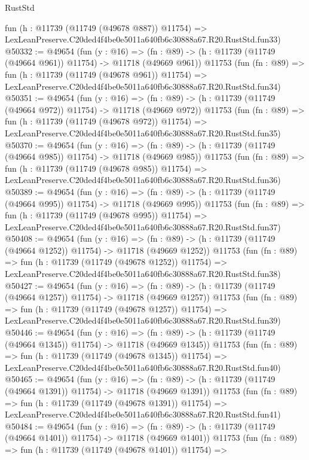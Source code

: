 \begin{lexlean}{RustStd}
\begin{coremodule}
    fun (h : @11739 (@11749 (@49678 @887)) @11754) =>
    LexLeanPreserve.C20ded4f4be0e5011a640fb6c30888a67.R20.RustStd.fun33)
@50332 := @49654
    (fun (y : @16) =>
    (fn : @89) -> (h : @11739 (@11749 (@49664 @961)) @11754) -> @11718 (@49669 @961))
    @11753
    (fun (fn : @89) =>
    fun (h : @11739 (@11749 (@49678 @961)) @11754) =>
    LexLeanPreserve.C20ded4f4be0e5011a640fb6c30888a67.R20.RustStd.fun34)
@50351 := @49654
    (fun (y : @16) =>
    (fn : @89) -> (h : @11739 (@11749 (@49664 @972)) @11754) -> @11718 (@49669 @972))
    @11753
    (fun (fn : @89) =>
    fun (h : @11739 (@11749 (@49678 @972)) @11754) =>
    LexLeanPreserve.C20ded4f4be0e5011a640fb6c30888a67.R20.RustStd.fun35)
@50370 := @49654
    (fun (y : @16) =>
    (fn : @89) -> (h : @11739 (@11749 (@49664 @985)) @11754) -> @11718 (@49669 @985))
    @11753
    (fun (fn : @89) =>
    fun (h : @11739 (@11749 (@49678 @985)) @11754) =>
    LexLeanPreserve.C20ded4f4be0e5011a640fb6c30888a67.R20.RustStd.fun36)
@50389 := @49654
    (fun (y : @16) =>
    (fn : @89) -> (h : @11739 (@11749 (@49664 @995)) @11754) -> @11718 (@49669 @995))
    @11753
    (fun (fn : @89) =>
    fun (h : @11739 (@11749 (@49678 @995)) @11754) =>
    LexLeanPreserve.C20ded4f4be0e5011a640fb6c30888a67.R20.RustStd.fun37)
@50408 := @49654
    (fun (y : @16) =>
    (fn : @89) -> (h : @11739 (@11749 (@49664 @1252)) @11754) -> @11718 (@49669 @1252))
    @11753
    (fun (fn : @89) =>
    fun (h : @11739 (@11749 (@49678 @1252)) @11754) =>
    LexLeanPreserve.C20ded4f4be0e5011a640fb6c30888a67.R20.RustStd.fun38)
@50427 := @49654
    (fun (y : @16) =>
    (fn : @89) -> (h : @11739 (@11749 (@49664 @1257)) @11754) -> @11718 (@49669 @1257))
    @11753
    (fun (fn : @89) =>
    fun (h : @11739 (@11749 (@49678 @1257)) @11754) =>
    LexLeanPreserve.C20ded4f4be0e5011a640fb6c30888a67.R20.RustStd.fun39)
@50446 := @49654
    (fun (y : @16) =>
    (fn : @89) -> (h : @11739 (@11749 (@49664 @1345)) @11754) -> @11718 (@49669 @1345))
    @11753
    (fun (fn : @89) =>
    fun (h : @11739 (@11749 (@49678 @1345)) @11754) =>
    LexLeanPreserve.C20ded4f4be0e5011a640fb6c30888a67.R20.RustStd.fun40)
@50465 := @49654
    (fun (y : @16) =>
    (fn : @89) -> (h : @11739 (@11749 (@49664 @1391)) @11754) -> @11718 (@49669 @1391))
    @11753
    (fun (fn : @89) =>
    fun (h : @11739 (@11749 (@49678 @1391)) @11754) =>
    LexLeanPreserve.C20ded4f4be0e5011a640fb6c30888a67.R20.RustStd.fun41)
@50484 := @49654
    (fun (y : @16) =>
    (fn : @89) -> (h : @11739 (@11749 (@49664 @1401)) @11754) -> @11718 (@49669 @1401))
    @11753
    (fun (fn : @89) =>
    fun (h : @11739 (@11749 (@49678 @1401)) @11754) =>

\end{coremodule}
\end{lexlean}

